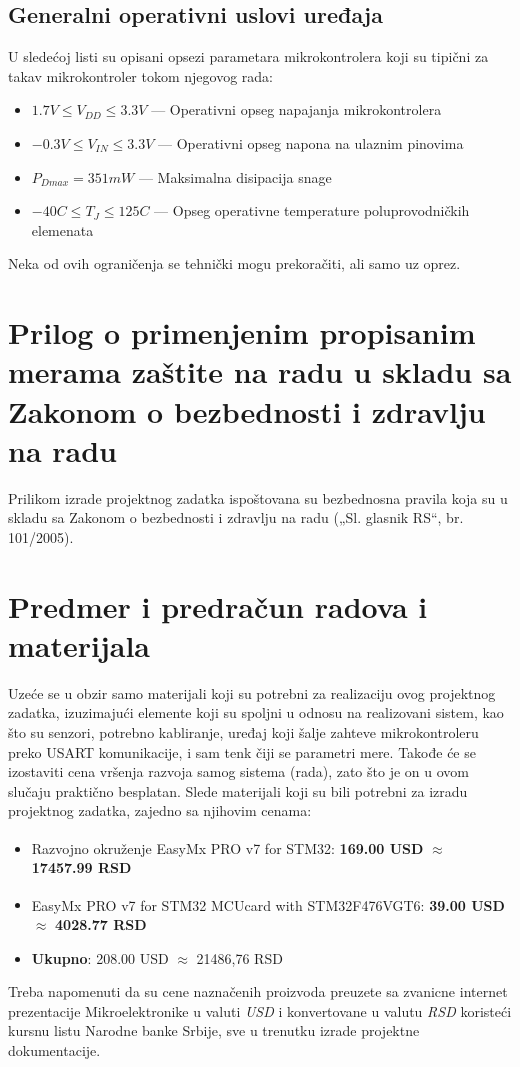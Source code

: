 \documentclass[a4paper, 12pt, oneside, titlepage]{article}
\begin{document}
      \subsection{Generalni operativni uslovi uređaja}
      U sledećoj listi su opisani opsezi parametara mikrokontrolera koji su tipični za takav mikrokontroler tokom njegovog rada:
      \begin{itemize}
	\item $1.7 V \le V_{DD} \le 3.3V$ --- Operativni opseg napajanja mikrokontrolera
	\item $-0.3V \le V_{IN} \le 3.3V$ --- Operativni opseg napona na ulaznim pinovima
	\item $P_{Dmax} = 351 mW$ --- Maksimalna disipacija snage
	\item $-40 $\textdegree$C \le T_{J} \le 125 $\textdegree$C$ --- Opseg operativne temperature poluprovodničkih elemenata
      \end{itemize}
      
      \noindent Neka od ovih ograničenja se tehnički mogu prekoračiti, ali samo uz oprez.
    
    \pagebreak
    \section{Prilog o primenjenim propisanim merama zaštite na radu u skladu sa Zakonom o bezbednosti i zdravlju na radu}
    Prilikom izrade projektnog zadatka ispoštovana su bezbednosna pravila koja su u skladu sa Zakonom o bezbednosti i zdravlju na radu („Sl. glasnik RS“, br. 101/2005).
    \pagebreak
    
    \section{Predmer i predračun radova i materijala}
    Uzeće se u obzir samo materijali koji su potrebni za realizaciju ovog projektnog zadatka, izuzimajući elemente koji su spoljni u odnosu na realizovani sistem, kao što su senzori,
    potrebno kabliranje, uređaj koji šalje zahteve mikrokontroleru preko USART komunikacije, i sam tenk čiji se parametri mere. Takođe će se izostaviti cena vršenja razvoja samog
    sistema (rada), zato što je on u ovom slučaju praktično besplatan.
    \bigbreak
    \noindent Slede materijali koji su bili potrebni za izradu projektnog zadatka, zajedno sa njihovim cenama:
    \begin{itemize}
      \item Razvojno okruženje EasyMx PRO\texttrademark{} v7 for STM32\textsuperscript{\textregistered}: \textbf{169.00 USD} $\approx$ \textbf{17457.99 RSD}
      \item EasyMx PRO\texttrademark{} v7 for STM32\textsuperscript{\textregistered} MCUcard with STM32F476VGT6: \textbf{39.00 USD} $\approx$ \textbf{4028.77 RSD}
      \item \textbf{Ukupno}: 208.00 USD $\approx$ 21486,76 RSD
    \end{itemize}
    \bigbreak
    Treba napomenuti da su cene naznačenih proizvoda preuzete sa zvanicne internet prezentacije Mikroelektronike u valuti \emph{USD} i konvertovane u valutu \emph{RSD} koristeći kursnu
    listu Narodne banke Srbije, sve u trenutku izrade projektne dokumentacije.
    
\end{document}
